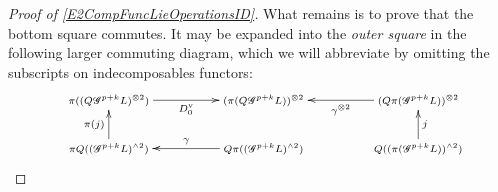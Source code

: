 \documentclass[11pt]{amsart}
\theoremstyle{plain}
\theoremstyle{definition}
\newcommand{\scrG}{\mathscr{G}}
\newcommand{\calW}{\mathcal{W}}
\theoremstyle{plain}
\newcommand{\BSW}{{\scrG}}
\begin{document}
\begin{Composite functor spectral sequences}
\begin{tricky proofs of operation compatibilities}
\begin{proof}[Proof of \ref{E2CompFuncLieOperationsID}]
What remains is to prove that the bottom square commutes. It may be expanded into the \emph{outer square} in the following larger commuting diagram, which we will abbreviate by omitting the subscripts on indecomposables functors:
\[
\def\objectstyle{\scriptstyle}
\xymatrix@R=6mm@C=13mm@!0{
&%
\pi((Q\BSW^{p+k}L)^{\otimes2}) \ar[rrr]_-{D_0^{\textup{v}}}
&%
&%
&%
(\pi (Q\BSW^{p+k}L))^{\otimes2}&%
&%
&%
(Q\pi(\BSW^{p+k}L))^{\otimes2} \ar[lll]^-{\gamma^{\otimes2}}\\\\%
&%
\pi Q((\BSW^{p+k}L)^{\wedge 2})\ar[uu]^-{\pi(j)}
&%
&%
&%
Q\pi((\BSW^{p+k}L)^{\wedge 2})\ar[lll]_-{\gamma}
&%
&%
&%
Q((\pi( \BSW^{p+k}L))^{\wedge 2})
\ar[uu]_-{j}
}\]
\end{proof}
\end{tricky proofs of operation compatibilities}
\end{Composite functor spectral sequences}
\end{document}
